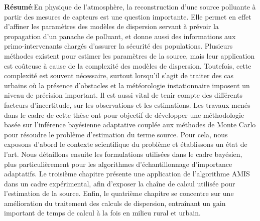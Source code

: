 {\small \textbf{Résumé}:En physique de l’atmosphère, la reconstruction d’une source polluante à partir des mesures de capteurs est une question importante. Elle permet en effet d’affiner les paramètres des modèles de dispersion servant à prévoir la propagation d’un panache de polluant, et donne aussi des informations aux primo-intervenants chargés d’assurer la sécurité des populations.
Plusieurs méthodes existent pour estimer les paramètres de la source, mais leur application est coûteuse à cause de la complexité des modèles de dispersion. Toutefois, cette complexité est souvent nécessaire, surtout lorsqu’il s’agit de traiter des cas urbains où la présence d’obstacles et la météorologie instationnaire imposent un niveau de précision important. Il est aussi vital de tenir compte des différents facteurs d’incertitude, sur les observations et les estimations.
Les travaux menés dans le cadre de cette thèse ont pour objectif de développer une méthodologie basée sur l’inférence bayésienne adaptative couplée aux méthodes de Monte Carlo pour résoudre le problème d’estimation du terme source. Pour cela, nous exposons d’abord le contexte scientifique du problème et établissons un état de l’art. Nous détaillons ensuite les formulations utilisées dans le cadre bayésien, plus particulièrement pour les algorithmes d’échantillonnage d’importance adaptatifs. Le troisième chapitre présente une application de l’algorithme AMIS dans un cadre expérimental, afin d’exposer la chaîne de calcul utilisée pour l’estimation de la source. Enfin, le quatrième chapitre se concentre sur une amélioration du traitement des calculs de dispersion, entraînant un gain important de temps de calcul à la fois en milieu rural et urbain.
}


\pagebreak